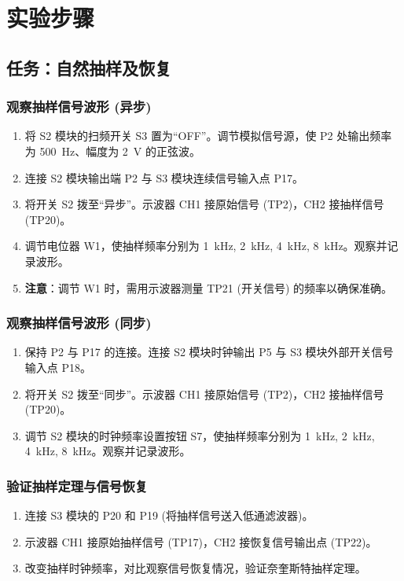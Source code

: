 \documentclass[12pt]{ctexart}
\begin{document}
\section{实验步骤}

\subsection{任务：自然抽样及恢复}

\subsubsection{观察抽样信号波形 (异步)}
\begin{enumerate}
    \item 将 S2 模块的扫频开关 S3 置为“OFF”。调节模拟信号源，使 P2 处输出频率为 \SI{500}{Hz}、幅度为 \SI{2}{V} 的正弦波。
    \item 连接 S2 模块输出端 P2 与 S3 模块连续信号输入点 P17。
    \item 将开关 S2 拨至“异步”。示波器 CH1 接原始信号 (TP2)，CH2 接抽样信号 (TP20)。
    \item 调节电位器 W1，使抽样频率分别为 \SI{1}{kHz}, \SI{2}{kHz}, \SI{4}{kHz}, \SI{8}{kHz}。观察并记录波形。
    \item \textbf{注意}：调节 W1 时，需用示波器测量 TP21 (开关信号) 的频率以确保准确。
\end{enumerate}

\subsubsection{观察抽样信号波形 (同步)}
\begin{enumerate}
    \item 保持 P2 与 P17 的连接。连接 S2 模块时钟输出 P5 与 S3 模块外部开关信号输入点 P18。
    \item 将开关 S2 拨至“同步”。示波器 CH1 接原始信号 (TP2)，CH2 接抽样信号 (TP20)。
    \item 调节 S2 模块的时钟频率设置按钮 S7，使抽样频率分别为 \SI{1}{kHz}, \SI{2}{kHz}, \SI{4}{kHz}, \SI{8}{kHz}。观察并记录波形。
\end{enumerate}

\subsubsection{验证抽样定理与信号恢复}
\begin{enumerate}
    \item 连接 S3 模块的 P20 和 P19 (将抽样信号送入低通滤波器)。
    \item 示波器 CH1 接原始抽样信号 (TP17)，CH2 接恢复信号输出点 (TP22)。
    \item 改变抽样时钟频率，对比观察信号恢复情况，验证奈奎斯特抽样定理。
\end{enumerate}
\end{document}
